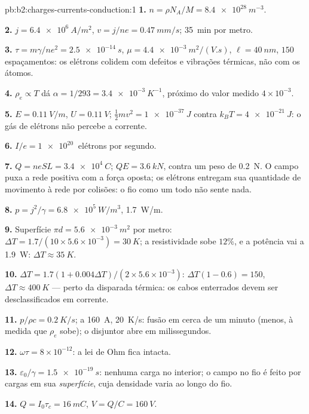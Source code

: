 \begin{solution}{pb:b2:charges-currents-conduction:1}
\textbf{1.} $n = \rho N_A/M = \qty{8.4e28}{m^{-3}}$.

\textbf{2.} $j = \qty{6.4e6}{A/m^2}$, $v = j/ne = \qty{0.47}{mm/s}$; \qty{35}{min} por metro.

\textbf{3.} $\tau = m\gamma/ne^2 = \qty{2.5e-14}{s}$, $\mu = \qty{4.4e-3}{m^2/(V.s)}$, $\ell =
\qty{40}{nm}$, $150$ espaçamentos: os elétrons colidem com defeitos e
vibrações térmicas, não com os átomos.

\textbf{4.} $\rho_e \propto T$ dá $\alpha = 1/293 = \qty{3.4e-3}{K^{-1}}$, próximo do
valor medido $4 \times 10^{-3}$.

\textbf{5.} $E = \qty{0.11}{V/m}$, $U = \qty{0.11}{V}$; $\tfrac12mv^2 = \qty{1e-37}{J}$ contra
$k_BT = \qty{4e-21}{J}$: o gás de elétrons não percebe a corrente.

\textbf{6.} $I/e = \qty{1e20}{}$ elétrons por segundo.

\textbf{7.} $Q = neSL = \qty{3.4e4}{C}$; $QE = \qty{3.6}{kN}$, contra um peso de
\qty{0.2}{N}. O campo puxa a rede positiva com a força oposta;
os elétrons entregam sua quantidade de movimento à rede por colisões:
o fio como um todo não sente nada.

\textbf{8.} $p = j^2/\gamma = \qty{6.8e5}{W/m^3}$, \qty{1.7}{W/m}.

\textbf{9.} Superfície $\pi d = \qty{5.6e-3}{m^2}$ por metro: $\Delta T = 1.7/(10 \times 5.6 \times
10^{-3}) = \qty{30}{K}$; a resistividade sobe $12\%$, e a potência vai a \qty{1.9}{W}:
$\Delta T \approx \qty{35}{K}$.

\textbf{10.} $\Delta T = 1.7(1 + 0.004\Delta T)/(2 \times 5.6 \times 10^{-3})$: $\Delta T(1 - 0.6) = 150$,
$\Delta T \approx \qty{400}{K}$ --- perto da disparada térmica: os cabos enterrados devem ser
desclassificados em corrente.

\textbf{11.} $p/\rho c = \qty{0.2}{K/s}$; a \qty{160}{A}, \qty{20}{K/s}: fusão em
cerca de um minuto (menos, à medida que $\rho_e$ sobe); o disjuntor abre em milissegundos.

\textbf{12.} $\omega\tau = 8 \times 10^{-12}$: a lei de Ohm fica intacta.

\textbf{13.} $\varepsilon_0/\gamma = \qty{1.5e-19}{s}$: nenhuma carga no interior; o campo no
fio é feito por cargas em sua \emph{superfície}, cuja densidade varia
ao longo do fio.

\textbf{14.} $Q = I_0\tau_c = \qty{16}{mC}$, $V = Q/C = \qty{160}{V}$.


\end{solution}

